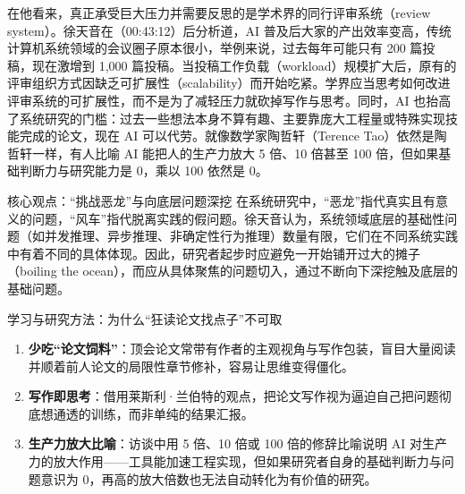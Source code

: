 \documentclass[UTF8,a4paper,11pt,fontset=fandol]{ctexart}
\begin{document}
在他看来，真正承受巨大压力并需要反思的是学术界的同行评审系统（review system）。徐天音在（00:43:12）后分析道，AI 普及后大家的产出效率变高，传统计算机系统领域的会议圈子原本很小，举例来说，过去每年可能只有 200 篇投稿，现在激增到 1,000 篇投稿。当投稿工作负载（workload）规模扩大后，原有的评审组织方式因缺乏可扩展性（scalability）而开始吃紧。学界应当思考如何改进评审系统的可扩展性，而不是为了减轻压力就砍掉写作与思考。同时，AI 也抬高了系统研究的门槛：过去一些想法本身不算有趣、主要靠庞大工程量或特殊实现技能完成的论文，现在 AI 可以代劳。就像数学家陶哲轩（Terence Tao）依然是陶哲轩一样，有人比喻 AI 能把人的生产力放大 5 倍、10 倍甚至 100 倍，但如果基础判断力与研究能力是 0，乘以 100 依然是 0。

\begin{importantbox}{核心观点：“挑战恶龙”与向底层问题深挖}
在系统研究中，“恶龙”指代真实且有意义的问题，“风车”指代脱离实践的假问题。徐天音认为，系统领域底层的基础性问题（如并发推理、异步推理、非确定性行为推理）数量有限，它们在不同系统实践中有着不同的具体体现。因此，研究者起步时应避免一开始铺开过大的摊子（boiling the ocean），而应从具体聚焦的问题切入，通过不断向下深挖触及底层的基础问题。
\end{importantbox}
\begin{knowledgebox}{学习与研究方法：为什么“狂读论文找点子”不可取}
\begin{enumerate}
\item \textbf{少吃“论文饲料”}：顶会论文常带有作者的主观视角与写作包装，盲目大量阅读并顺着前人论文的局限性章节修补，容易让思维变得僵化。
\item \textbf{写作即思考}：借用莱斯利·兰伯特的观点，把论文写作视为逼迫自己把问题彻底想通透的训练，而非单纯的结果汇报。
\item \textbf{生产力放大比喻}：访谈中用 5 倍、10 倍或 100 倍的修辞比喻说明 AI 对生产力的放大作用——工具能加速工程实现，但如果研究者自身的基础判断力与问题意识为 0，再高的放大倍数也无法自动转化为有价值的研究。
\end{enumerate}
\end{knowledgebox}
\end{document}
